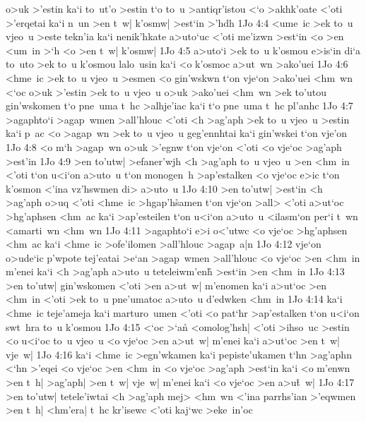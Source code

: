 o>uk
>'estin
ka`i
to~ut'o
>estin
t`o
to~u
>antiqr'istou
<`o
>akhk'oate
<'oti
>'erqetai
ka`i
n~un
>en
t~w|
k'osmw|
>est`in
>'hdh\bibvsend
\vs 1Jo 4:4
<ume~ic
>ek
to~u
vjeo~u
>este
tekn'ia
ka`i
nenik'hkate
a>uto`uc
<'oti
me'izwn
>est`in
<o
>en
<um~in
>`h
<o
>en
t~w|
k'osmw|\bibvsend
\vs 1Jo 4:5
a>uto`i
>ek
to~u
k'osmou
e>is`in
di`a
to~uto
>ek
to~u
k'osmou
lalo~usin
ka`i
<o
k'osmoc
a>ut~wn
>ako'uei\bibvsend
\vs 1Jo 4:6
<hme~ic
>ek
to~u
vjeo~u
>esmen
<o
gin'wskwn
t`on
vje`on
>ako'uei
<hm~wn
<`oc
o>uk
>'estin
>ek
to~u
vjeo~u
o>uk
>ako'uei
<hm~wn
>ek
to'utou
gin'wskomen
t`o
pne~uma
t~hc
>alhje'iac
ka`i
t`o
pne~uma
t~hc
pl'anhc\bibvsend
\vs 1Jo 4:7
>agaphto`i
>agap~wmen
>all'hlouc
<'oti
<h
>ag'aph
>ek
to~u
vjeo~u
>estin
ka`i
p~ac
<o
>agap~wn
>ek
to~u
vjeo~u
geg'ennhtai
ka`i
gin'wskei
t`on
vje'on\bibvsend
\vs 1Jo 4:8
<o
m`h
>agap~wn
o>uk
>'egnw
t`on
vje`on
<'oti
<o
vje`oc
>ag'aph
>est'in\bibvsend
\vs 1Jo 4:9
>en
to'utw|
>efaner'wjh
<h
>ag'aph
to~u
vjeo~u
>en
<hm~in
<'oti
t`on
u<i`on
a>uto~u
t`on
monogen~h
>ap'estalken
<o
vje`oc
e>ic
t`on
k'osmon
<'ina
vz'hswmen
di>
a>uto~u\bibvsend
\vs 1Jo 4:10
>en
to'utw|
>est`in
<h
>ag'aph
o>uq
<'oti
<hme~ic
>hgap'h\r{s}amen
t`on
vje`on
>all>
<'oti
a>ut`oc
>hg'aphsen
<hm~ac
ka`i
>ap'esteilen
t`on
u<i`on
a>uto~u
<ilasm`on
per`i
t~wn
<amarti~wn
<hm~wn\bibvsend
\vs 1Jo 4:11
>agaphto`i
e>i
o<'utwc
<o
vje`oc
>hg'aphsen
<hm~ac
ka`i
<hme~ic
>ofe'ilomen
>all'hlouc
>agap~a|n\bibvsend
\vs 1Jo 4:12
vje`on
o>ude`ic
p'wpote
tej'eatai
>e`an
>agap~wmen
>all'hlouc
<o
vje`oc
>en
<hm~in
m'enei
ka`i
<h
>ag'aph
a>uto~u
teteleiwm'enh\r{}
>est`in
>en
<hm~in\bibvsend
\vs 1Jo 4:13
>en
to'utw|
gin'wskomen
<'oti
>en
a>ut~w|
m'enomen
ka`i
a>ut`oc
>en
<hm~in
<'oti
>ek
to~u
pne'umatoc
a>uto~u
d'edwken
<hm~in\bibvsend
\vs 1Jo 4:14
ka`i
<hme~ic
teje'ameja
ka`i
marturo~umen
<'oti
<o
pat`hr
>ap'estalken
t`on
u<i`on
swt~hra
to~u
k'osmou\bibvsend
\vs 1Jo 4:15
<`oc
>`a\r{n}
<omolog'hsh|
<'oti
>ihso~uc
>estin
<o
u<i`oc
to~u
vjeo~u
<o
vje`oc
>en
a>ut~w|
m'enei
ka`i
a>ut`oc
>en
t~w|
vje~w|\bibvsend
\vs 1Jo 4:16
ka`i
<hme~ic
>egn'wkamen
ka`i
pepiste'ukamen
t`hn
>ag'aphn
<`hn
>'eqei
<o
vje`oc
>en
<hm~in
<o
vje`oc
>ag'aph
>est`in
ka`i
<o
m'enwn
>en
t~h|
>ag'aph|
>en
t~w|
vje~w|
m'enei
ka`i
<o
vje`oc
>en
a>u\r{t}~w|\bibvsend
{}
\vs 1Jo 4:17
>en
to'utw|
tetele'iwtai
<h
>ag'aph
mej>
<hm~wn
<'ina
parrhs'ian
>'eqwmen
>en
t~h|
<hm'era|
t~hc
kr'isewc
<'oti
kaj`wc
>eke~in'oc
